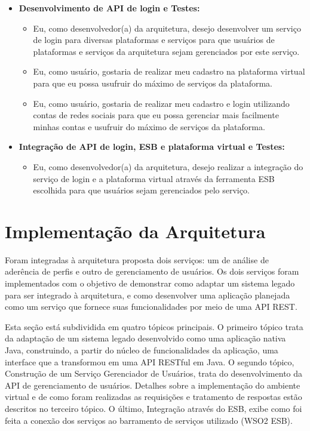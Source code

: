\begin{itemize}
\item \textbf{Desenvolvimento de API de login e Testes:} 
\begin{itemize}
\item Eu, como desenvolvedor(a) da arquitetura, desejo desenvolver um serviço de login para diversas plataformas e serviços para que usuários de plataformas e serviços da arquitetura sejam gerenciados por este serviço.
\item Eu, como usuário, gostaria de realizar meu cadastro na plataforma virtual para que eu possa usufruir do máximo de serviços da plataforma.
\item Eu, como usuário, gostaria de realizar meu cadastro e login utilizando contas de redes sociais para que eu possa gerenciar mais facilmente minhas contas e usufruir do máximo de serviços da plataforma.
\end{itemize}

\item \textbf{Integração de API de login, ESB e plataforma virtual e Testes:} 
\begin{itemize}
\item Eu, como desenvolvedor(a) da arquitetura, desejo realizar a integração do serviço de login e a plataforma virtual através da ferramenta ESB escolhida para que usuários sejam gerenciados pelo serviço.
\end{itemize}

\end{itemize}

\section{Implementação da Arquitetura}
Foram integradas à arquitetura proposta dois serviços: um de análise de aderência de perfis e outro de gerenciamento de usuários. Os dois serviços foram implementados com o objetivo de demonstrar como adaptar um sistema legado para ser integrado à arquitetura, e como desenvolver uma aplicação planejada como um serviço que fornece suas funcionalidades por meio de uma API REST.

Esta seção está subdividida em quatro tópicos principais. O primeiro tópico trata da adaptação de um sistema legado desenvolvido como uma aplicação nativa Java, construindo, a partir do núcleo de funcionalidades da aplicação, uma interface que a transformou em uma API RESTful em Java. O segundo tópico, Construção de um Serviço Gerenciador de Usuários, trata do desenvolvimento da API de gerenciamento de usuários. Detalhes sobre a implementação do ambiente virtual e de como foram realizadas as requisições e tratamento de respostas estão descritos no terceiro tópico. O último, Integração através do ESB, exibe como foi feita a conexão dos serviços ao barramento de serviços utilizado (WSO2 ESB).

